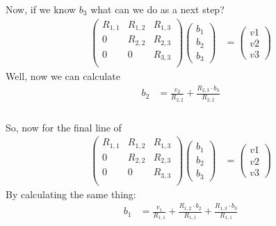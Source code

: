 \begin{frame}[fragile] \frametitle{}

Now, if we know $b_3$ what can we do as a next step?
\begin{align*}
\left(
\begin{array}{ccc} R_{1,1} & R_{1,2} & R_{1,3} \\
                   0       & R_{2,2} & R_{2,3} \\
                   0       & 0       & R_{3,3} \\
\end{array} \right) \left(\begin{array}{c} b_1 \\ b_2 \\ b_3 \end{array} \right)
 &= \left(\begin{array}{c} v1 \\ v2 \\ v3 \end{array} \right)
\end{align*}
\pause Well, now we can calculate
\begin{align*}
b_2 &= \frac{v_2}{R_{2,2}} +  \frac{R_{2,3} \cdot b_3}{R_{2,2}}
\end{align*}

\end{frame}

\begin{frame}[fragile] \frametitle{}

So, now for the final line of
\begin{align*}
\left(
\begin{array}{ccc} R_{1,1} & R_{1,2} & R_{1,3} \\
                   0       & R_{2,2} & R_{2,3} \\
                   0       & 0       & R_{3,3} \\
\end{array} \right) \left(\begin{array}{c} b_1 \\ b_2 \\ b_3 \end{array} \right)
 &= \left(\begin{array}{c} v1 \\ v2 \\ v3 \end{array} \right)
\end{align*}
By calculating the same thing:
\begin{align*}
b_1 &= \frac{v_1}{R_{1,1}} + \frac{R_{1,2} \cdot b_2}{R_{1,1}} + \frac{R_{1,3} \cdot b_3}{R_{1,1}}
\end{align*}

\end{frame}

